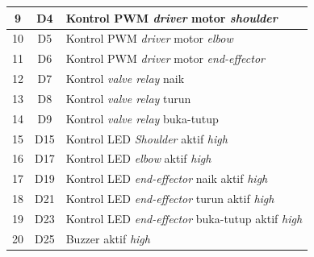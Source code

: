 \begin{longtable}{|c|c|l|}
	9                         & D4                                 & Kontrol PWM \textit{driver} motor \textit{shoulder}                                          \\ \hline
	10                        & D5                                 & Kontrol PWM \textit{driver} motor \textit{elbow}                                             \\ \hline
	11                        & D6                                 & Kontrol PWM \textit{driver} motor \textit{end-effector}                                      \\ \hline
	12                        & D7                                 & Kontrol \textit{valve relay} naik                                                   \\ \hline
	13                        & D8                                 & Kontrol \textit{valve relay} turun                                                  \\ \hline
	14                        & D9                                 & Kontrol \textit{valve relay} buka-tutup                                             \\ \hline
	15                        & D15                                & Kontrol LED \textit{Shoulder} aktif \textit{high}                                            \\ \hline
	16                        & D17                                & Kontrol LED \textit{elbow} aktif \textit{high}                                               \\ \hline
	17                        & D19                                & Kontrol LED \textit{end-effector} naik aktif \textit{high}                                   \\ \hline
	18                        & D21                                & Kontrol LED \textit{end-effector} turun aktif \textit{high}                                  \\ \hline
	19                        & D23                                & Kontrol LED \textit{end-effector} buka-tutup aktif \textit{high}                             \\ \hline
	20                        & D25                                & Buzzer aktif \textit{high}                                                          \\ \hline
\end{longtable}

